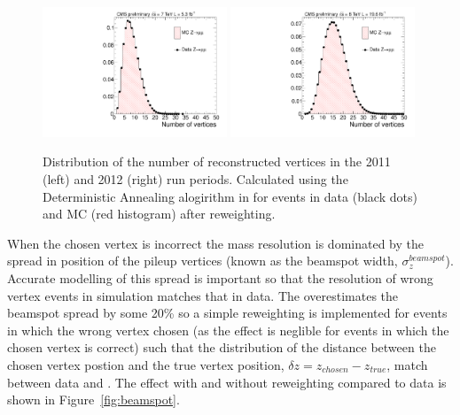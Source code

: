 \begin{figure}
  \begin{center}
  \includegraphics[width=0.49\textwidth]{ch3_comm_anal_comps/plots/nvtx_zmumu_2011.pdf}
  \includegraphics[width=0.49\textwidth]{ch3_comm_anal_comps/plots/nvtx_zmumu_2012.pdf}
  \caption{Distribution of the number of reconstructed vertices in the 2011 (left) and 2012 (right) run periods. Calculated using the Deterministic Annealing alogirithm in  for \Zmumu events in data (black dots) and MC (red histogram) after reweighting.}
  \label{fig:pileup}
  \end{center}
\end{figure}

When the chosen vertex is incorrect the mass resolution is dominated by the spread in position of the pileup vertices (known as the beamspot width, $\sigma_{z}^{beamspot}$). Accurate modelling of this spread is important so that the resolution of wrong vertex events in simulation matches that in data. The \MC overestimates the beamspot spread by some 20\% so a simple reweighting is implemented for \MC events in which the wrong vertex chosen (as the effect is neglible for events in which the chosen vertex is correct) such that the distribution of the distance between the chosen vertex postion and the true vertex position, $\delta z=z_{chosen}-z_{true}$, match between data and \MC. The effect with and without reweighting compared to data is shown in Figure~\ref{fig:beamspot}.

